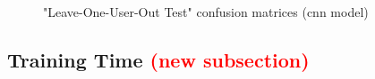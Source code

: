 \begin{figure}[ht]
   \centering
   \begin{subfigure}[b]{0.32\columnwidth}
       {\fontsize{8}{10}\selectfont}
       \caption{\centering}
   \end{subfigure} \
   \begin{subfigure}[b]{0.32\columnwidth}
       {\fontsize{8}{10}\selectfont}
       \caption{\centering}
   \end{subfigure} \
   \begin{subfigure}[b]{0.32\columnwidth}
       {\fontsize{8}{10}\selectfont}
       \caption{\centering}
   \end{subfigure}
   \caption{"Leave-One-User-Out Test" confusion matrices (\acs{cnn} model)}
   \label{fig:conf_matrix_examplesC_v2}
\end{figure}


\subsection{Training Time \textcolor{red}{(new subsection)}}

